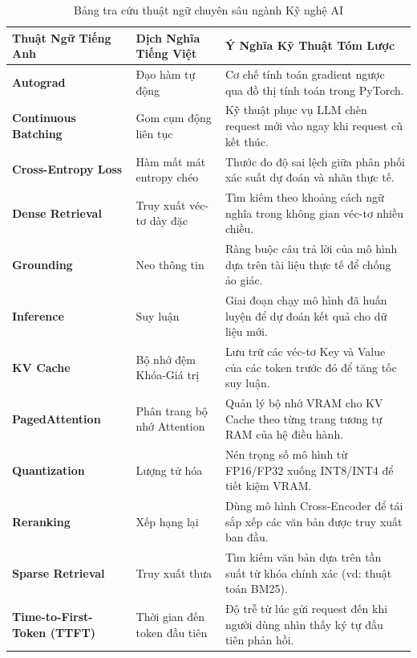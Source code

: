 \begin{table}[htbp]
\centering
\small
\begin{tabular}{|p{}|p{}|p{}|}
\hline
\textbf{Thuật Ngữ Tiếng Anh} & \textbf{Dịch Nghĩa Tiếng Việt} & \textbf{Ý Nghĩa Kỹ Thuật Tóm Lược} \\
\hline
\textbf{Autograd} & Đạo hàm tự động & Cơ chế tính toán gradient ngược qua đồ thị tính toán trong PyTorch. \\
\hline
\textbf{Continuous Batching} & Gom cụm động liên tục & Kỹ thuật phục vụ LLM chèn request mới vào ngay khi request cũ kết thúc. \\
\hline
\textbf{Cross-Entropy Loss} & Hàm mất mát entropy chéo & Thước đo độ sai lệch giữa phân phối xác suất dự đoán và nhãn thực tế. \\
\hline
\textbf{Dense Retrieval} & Truy xuất véc-tơ dày đặc & Tìm kiếm theo khoảng cách ngữ nghĩa trong không gian véc-tơ nhiều chiều. \\
\hline
\textbf{Grounding} & Neo thông tin & Ràng buộc câu trả lời của mô hình dựa trên tài liệu thực tế để chống ảo giác. \\
\hline
\textbf{Inference} & Suy luận & Giai đoạn chạy mô hình đã huấn luyện để dự đoán kết quả cho dữ liệu mới. \\
\hline
\textbf{KV Cache} & Bộ nhớ đệm Khóa-Giá trị & Lưu trữ các véc-tơ Key và Value của các token trước đó để tăng tốc suy luận. \\
\hline
\textbf{PagedAttention} & Phân trang bộ nhớ Attention & Quản lý bộ nhớ VRAM cho KV Cache theo từng trang tương tự RAM của hệ điều hành. \\
\hline
\textbf{Quantization} & Lượng tử hóa & Nén trọng số mô hình từ FP16/FP32 xuống INT8/INT4 để tiết kiệm VRAM. \\
\hline
\textbf{Reranking} & Xếp hạng lại & Dùng mô hình Cross-Encoder để tái sắp xếp các văn bản được truy xuất ban đầu. \\
\hline
\textbf{Sparse Retrieval} & Truy xuất thưa & Tìm kiếm văn bản dựa trên tần suất từ khóa chính xác (vd: thuật toán BM25). \\
\hline
\textbf{Time-to-First-Token (TTFT)} & Thời gian đến token đầu tiên & Độ trễ từ lúc gửi request đến khi người dùng nhìn thấy ký tự đầu tiên phản hồi. \\
\hline
\end{tabular}
\caption{Bảng tra cứu thuật ngữ chuyên sâu ngành Kỹ nghệ AI}
\label{tbl:appendix-glossary-table}
\end{table}

